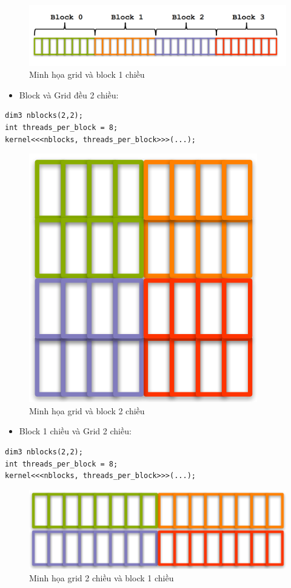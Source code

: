 \documentclass[14pt, a4paper]{article}
\numberwithin{equation}{section}
\numberwithin{figure}{section}
\numberwithin{dl}{section}
\numberwithin{md}{section}
\numberwithin{bd}{section}
\numberwithin{dn}{section}
\numberwithin{hq}{section}
\begin{document}
\begin{figure}[H]
    \centering
    \includegraphics[width=0.7\linewidth]{figures/CUDA/1d_Grid_Block.png}
    \caption{Minh họa grid và block 1 chiều}
\end{figure}

\begin{itemize}
        \item Block và Grid đều 2 chiều:
    \end{itemize}
    \begin{verbatim}
dim3 nblocks(2,2);
int threads_per_block = 8;
kernel<<<nblocks, threads_per_block>>>(...);
    \end{verbatim}

    \begin{figure}[H]
        \centering
        \includegraphics[width=0.5\linewidth]{figures/CUDA/2d_Grid_Block.png}
        \caption{Minh họa grid và block 2 chiều}
    \end{figure}

    \begin{itemize}
        \item Block 1 chiều và Grid 2 chiều:
    \end{itemize}

    \begin{verbatim}
dim3 nblocks(2,2);
int threads_per_block = 8;
kernel<<<nblocks, threads_per_block>>>(...);
    \end{verbatim}

    \begin{figure}[H]
        \centering
        \includegraphics[width=0.7\linewidth]{figures/CUDA/2d_1d_Grid_Block.png}
        \caption{Minh họa grid 2 chiều và block 1 chiều}
    \end{figure}
\end{document}
